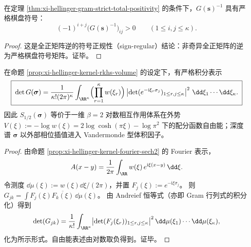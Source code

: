\begin{corollary}\label{cor:xi-hellinger-gram-inverse-checkerboard}
在定理 \ref{thm:xi-hellinger-gram-strict-total-positivity} 的条件下，\(G(\mathbf s)^{-1}\) 具有严格棋盘符号：
\[
\boxed{\;
(-1)^{i+j}\bigl(G(\mathbf s)^{-1}\bigr)_{ij}>0\qquad(1\le i,j\le \kappa).\;}
\]
\end{corollary}
\begin{proof}
这是全正矩阵逆的符号正规性（sign-regular）结论：非奇异全正矩阵的逆为严格棋盘符号矩阵。证毕。
\end{proof}

\begin{proposition}\label{prop:xi-hellinger-kernel-andreief-loggas}
在命题 \ref{prop:xi-hellinger-kernel-rkhs-volume} 的设定下，有严格积分表示
\[
\boxed{\;
\det G(\boldsymbol{\sigma})
=\frac{1}{\kappa!(2\pi)^{\kappa}}
\int_{\RR^\kappa}
\Bigl(\prod_{r=1}^{\kappa} w(\xi_r)\Bigr)\,
\bigl|\det(e^{-\mathrm{i}\xi_r\sigma_j})_{1\le r,j\le\kappa}\bigr|^{2}
\ \dd\xi_1\cdots \dd\xi_\kappa.\;}
\]
因此 \(S_{1/2}(\boldsymbol{\sigma})\) 等价于一维 \(\beta=2\) 对数相互作用体系在外势
\(
V(\xi):=-\log w(\xi)=2\log\cosh(\pi\xi)-\log\pi^{2}
\)
下的配分函数自由能；深度谱 \(\boldsymbol{\sigma}\) 以外部相位插值进入 Vandermonde 型体积因子。
\end{proposition}
\begin{proof}
由命题 \ref{prop:xi-hellinger-kernel-fourier-sech2} 的 Fourier 表示，
\[
A(x-y)=\frac{1}{2\pi}\int_{\RR}w(\xi)\,e^{\mathrm{i}\xi(x-y)}\,\dd\xi.
\]
令测度 \(\dd\mu(\xi):=w(\xi)\dd\xi/(2\pi)\)，并置
\(
F_j(\xi):=e^{-\mathrm{i}\xi\sigma_j}
\)。
则 \(G_{jk}=\int F_j(\xi)\overline{F_k(\xi)}\,\dd\mu(\xi)\)。
由 Andreief 恒等式（亦即 Gram 行列式的积分化）得到
\[
\det(G_{jk})
=\frac{1}{\kappa!}\int_{\RR^\kappa}\bigl|\det(F_j(\xi_r))_{1\le r,j\le\kappa}\bigr|^{2}\,\dd\mu(\xi_1)\cdots\dd\mu(\xi_\kappa),
\]
化为所示形式。自由能表述由对数取负得到。证毕。
\end{proof}

